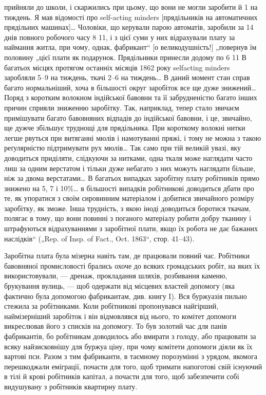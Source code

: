 \parcont{}  %
прийняли до школи, і скаржились при цьому, що вони не могли
заробити й 1 на тиждень. Я мав відомості про self-acting
minders [прядільників на автоматичних прядільних машинах]\dots{}
Чоловіки, що керували парою автоматів, заробили за 14 днів
повного робочого часу 8 11, і з цієї суми у них відрахували
плату за наймання житла, при чому, однак, фабрикант“
[о великодушність!] „повернув їм половину „цієї плати як
подарунок. Прядільники принесли додому по 6 11
В багатьох місцях протягом останніх місяців 1862 року selfacting
minders заробляли 5--9 на тиждень, ткачі 2--6
на тиждень\dots{} В даний момент стан справ багато нормальніший,
хоча в більшості округ заробіток все ще дуже знижений\dots{}
Поряд з коротким волокном індійської бавовни та її забрудненістю
багато інших причин сприяли зниженню заробітку. Так,
наприклад, тепер стало звичаєм примішувати багато бавовняних
відпадів до індійської бавовни, і це, звичайно, ще дужче збільшує
труднощі для прядільника. При короткому волокні нитки
легше рвуться при витяганні мюлів і намотуванні пряжі, і тому
не можна з такою реґулярністю підтримувати рух мюлів\dots{} Так
само при тій великій увазі, яку доводиться приділяти, слідкуючи
за нитками, одна ткаля може наглядати часто лиш за одним верстатом
і тільки дуже небагато з них можуть наглядати більше,
ніж за двома верстатами\dots{} В багатьох випадках заробітну плату
робітників прямо знижено на 5, 7 і 10\%\dots{} в більшості випадків
робітникові доводиться дбати про те, як упоратися з своїм сировинним
матеріалом і добитися звичайного розміру заробітку, як
зможе. Інша трудність, з якою іноді доводиться боротися ткачам,
полягає в тому, що вони повинні з поганого матеріалу робити
добру тканину і штрафуються відрахуваннями з заробітної
плати, якщо їх робота не дає бажаних наслідків“ („Rep. of Insp.
of Fact., Oct. 1863“, стор. 41--43).

Заробітна плата була мізерна навіть там, де працювали повний
час. Робітники бавовняної промисловості брались охоче до всяких
громадських робіт, на яких їх використовували, — дренаж, прокладання
шляхів, розбивання каменю, брукування вулиць, — щоб
одержати від місцевих властей допомогу (яка фактично була допомогою
фабрикантам, див. книгу I). Вся буржуазія
пильно стежила за робітниками. Коли робітникові пропонувався
найгірший, наймізерніший заробіток і він відмовлявся від нього,
то комітет допомоги викреслював його з списків на допомогу. То
був золотий час для панів фабрикантів, бо робітникам доводилось
або вмирати з голоду, або працювати за всяку найзисковнішу
для буржуа ціну, при чому комітети допомоги діяли як
їх вартові пси. Разом з тим фабриканти, в таємному порозумінні
з урядом, якомога перешкоджали еміграції, почасти для
того, щоб тримати напоготові свій існуючий в тілі й крові робітників
капітал, а почасти для того, щоб забезпечити собі видушувану
з робітників квартирну плату.

